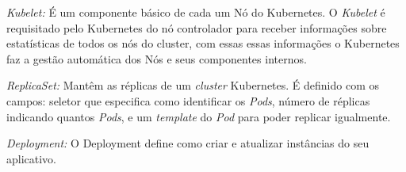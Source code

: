 



\textit{Kubelet:} É um componente básico de cada um Nó do Kubernetes. O \textit{Kubelet} é requisitado pelo Kubernetes do nó controlador para receber informações sobre estatísticas de todos os nós do cluster, com essas essas informações o Kubernetes faz a gestão automática dos Nós e seus componentes internos.


\textit{ReplicaSet:} Mantêm as réplicas de um \textit{cluster} Kubernetes. É definido com os campos: seletor que especifica como identificar os \textit{Pods}, número de réplicas indicando quantos \textit{Pods}, e um \textit{template} do \textit{Pod} para poder replicar igualmente.

\textit{Deployment:} O Deployment define como criar e atualizar instâncias do seu aplicativo.



